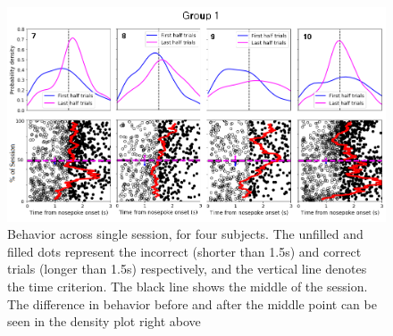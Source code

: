 \begin{figure}
    \centering
    \includegraphics[width=\textwidth]{figures/grupo1.png}
    \caption[Behavior across single session]{Behavior across single session, for four subjects. The unfilled and filled dots represent the incorrect (shorter than 1.5s) and correct trials (longer than 1.5s) respectively, and the vertical line denotes the time criterion. The black line shows the middle of the session. The difference in behavior before and after the middle point can be seen in the density plot right above}
    \label{fig:behavior}
\end{figure} %

